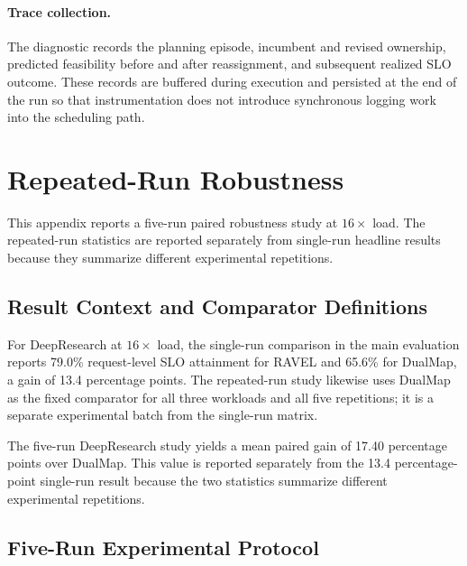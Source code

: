\documentclass[letterpaper,twocolumn,10pt]{article}
\begin{document}
\paragraph{Trace collection.}
The diagnostic records the planning episode, incumbent and revised ownership,
predicted feasibility before and after reassignment, and subsequent realized
SLO outcome.
These records are buffered during execution and persisted at the end of the
run so that instrumentation does not introduce synchronous logging work into
the scheduling path.


\section{Repeated-Run Robustness}
\label{app:repeated-runs}

This appendix reports a five-run paired robustness study at
$16\times$ load.  The repeated-run statistics are reported separately from
single-run headline results because they summarize different experimental
repetitions.


\subsection{Result Context and Comparator Definitions}
\label{sec:appendix:result-contexts}

For DeepResearch at $16\times$ load, the single-run comparison in the main
evaluation reports 79.0\% request-level SLO attainment for \textsc{RAVEL} and
65.6\% for DualMap, a gain of 13.4 percentage points.
The repeated-run study likewise uses DualMap as the fixed comparator for all
three workloads and all five repetitions; it is a separate experimental batch
from the single-run matrix.

The five-run DeepResearch study yields a mean paired gain of 17.40 percentage
points over DualMap.  This value is reported separately from the 13.4
percentage-point single-run result because the two statistics summarize
different experimental repetitions.


\subsection{Five-Run Experimental Protocol}
\label{sec:appendix:repeated-run-protocol}
\end{document}
